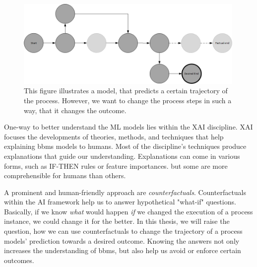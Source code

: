 \documentclass[./../../paper.tex]{subfiles}
\begin{document}
\begin{figure}[htb]
    \centering
    \includegraphics[width=0.99\textwidth]{figures/counterfactual_goal.png}
    \caption{This figure illustrates a model, that predicts a certain trajectory of the process. However, we want to change the process steps in such a way, that it changes the outcome.}
    \label{fig:desired_outcome}
\end{figure}

\noindent One-way to better understand the \gls{ML} models lies within the \gls{XAI} discipline. XAI focuses the developments of theories, methods, and techniques that help explaining \glspl{bbm} models to humans. Most of the discipline's techniques produce explanations that guide our understanding. Explanations can come in various forms, such as IF-THEN rules\autocite[p.90]{molnar2019} or feature importances\autocite[p.45]{molnar2019}. but some are more comprehensible for humans than others. 

A prominent and human-friendly approach are \emph{counterfactuals}\needscite{}. Counterfactuals within the AI framework help us to answer hypothetical "what-if" questions. Basically, if we know \emph{what} would happen \emph{if} we changed the execution of a process instance, we could change it for the better. In this thesis, we will raise the question, how we can use counterfactuals to change the trajectory of a process models' prediction towards a desired outcome. Knowing the answers not only increases the understanding of \glspl{bbm}, but also help us avoid or enforce certain outcomes. 
\end{document}
